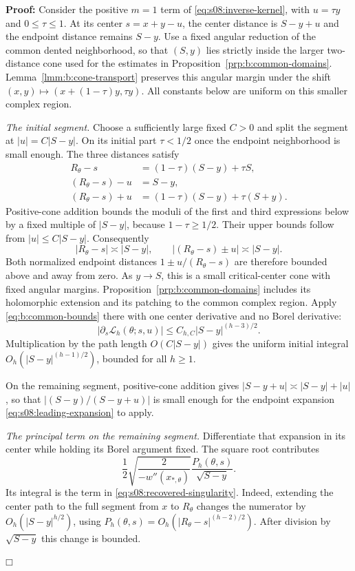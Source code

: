 \documentclass[a4paper,10pt]{article}
\numberwithin{equation}{section}
\theoremstyle{paperplain}
\theoremstyle{paperremark}
\theoremstyle{paperplain}
\newenvironment{prf}{\noindent \textbf{Proof: }}{\hfill $\mdlgwhtsquare$\par\addvspace{0.5\baselineskip}}
\begin{document}
\begin{prf}
Consider the positive $m=1$ term of
\eqref{eq:s08:inverse-kernel}, with $u=\tau y$ and $0\leq\tau\leq1$.
At its center $s=x+y-u$, the center distance is $S-y+u$
and the endpoint distance remains $S-y$. Use a fixed angular
reduction of the common dented neighborhood, so that $(S,y)$ lies
strictly inside the larger two-distance cone used for the estimates
in Proposition~\ref{prp:b:common-domains}.
Lemma~\ref{lmm:b:cone-transport} preserves this angular margin
under the shift $(x,y)\mapsto(x+(1-\tau)y,\tau y)$.
All constants below are uniform on this smaller complex region.

\smallskip\noindent
\emph{The initial segment.}
Choose a sufficiently large fixed $C>0$ and split the segment at
$|u|=C|S-y|$. On its initial part $\tau<1/2$ once the endpoint
neighborhood is small enough. The three distances satisfy
\[
 \begin{aligned}
 R_\theta-s&=(1-\tau)(S-y)+\tau S,\\
 (R_\theta-s)-u&=S-y,\\
 (R_\theta-s)+u&=(1-\tau)(S-y)+\tau(S+y).
 \end{aligned}
\]
Positive-cone addition bounds the moduli of the first and third
expressions below by a fixed multiple of $|S-y|$, because
$1-\tau\geq1/2$. Their upper bounds follow from
$|u|\leq C|S-y|$. Consequently
\[
 |R_\theta-s|\asymp |S-y|,\qquad
 |(R_\theta-s)\pm u|\asymp |S-y|.
\]
Both normalized endpoint distances $1\pm u/(R_\theta-s)$
are therefore bounded above and away from zero.
As $y\to S$, this is a small critical-center cone with fixed
angular margins. Proposition~\ref{prp:b:common-domains} includes
its holomorphic extension and its patching to the common complex
region. Apply \eqref{eq:b:common-bounds} there with one center
derivative and no Borel derivative:
\[
 |\partial_s\mathcal L_h(\theta;s,u)|
       \leq C_{h,C}|S-y|^{(h-3)/2}.
\]
Multiplication by the path length $O(C|S-y|)$ gives the uniform
initial integral $O_h(|S-y|^{(h-1)/2})$, bounded for all $h\geq1$.

On the remaining segment, positive-cone addition gives
$|S-y+u|\asymp |S-y|+|u|$, so that
$|(S-y)/(S-y+u)|$ is small enough for
the endpoint expansion \eqref{eq:s08:leading-expansion} to apply.

\smallskip\noindent
\emph{The principal term on the remaining segment.}
Differentiate that expansion in its center while holding its Borel
argument fixed. The square root contributes
\[
 \frac12\sqrt{\frac{2}{-w''(x_{*,\theta})}}
               \frac{P_h(\theta,s)}{\sqrt{S-y}}.
\]
Its integral is the term in \eqref{eq:s08:recovered-singularity}.
Indeed, extending the center path to the full segment from $x$ to
$R_\theta$ changes the numerator by
$O_h(|S-y|^{h/2})$, using
$P_h(\theta,s)=O_h(|R_\theta-s|^{(h-2)/2})$.
After division by $\sqrt{S-y}$ this change is bounded.


\end{prf}
\end{document}
